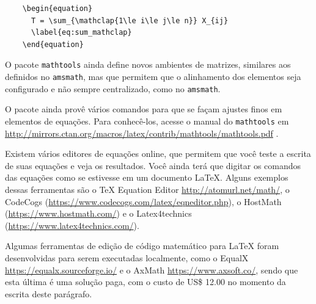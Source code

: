\begin{listing}[ht]
	\begin{verbatim}
	\begin{equation}
	  T = \sum_{\mathclap{1\le i\le j\le n}} X_{ij}
	  \label{eq:sum_mathclap}
	\end{equation}
	\end{verbatim} 
	\caption{Exemplo do uso do comando \textbackslash \texttt{mathclap}.}
	\label{cod:mathclap}
\end{listing}

O pacote \texttt{mathtools} ainda define novos ambientes de matrizes, similares aos definidos no \texttt{amsmath}, mas que permitem que o alinhamento dos elementos seja configurado e não sempre centralizado, como no \texttt{amsmath}. 

O pacote ainda provê vários comandos para que se façam ajustes finos em elementos de equações. Para conhecê-los, acesse o manual do \texttt{mathtools} em 
\url{http://mirrors.ctan.org/macros/latex/contrib/mathtools/mathtools.pdf} \parencite{mathtools}.

Existem vários editores de equações online, que permitem que você teste a escrita de suas equações e veja os resultados. Você ainda terá que digitar os comandos das equações como se estivesse em um documento \LaTeX{}. Alguns exemplos dessas ferramentas são o \TeX{} Equation Editor \url{http://atomurl.net/math/}, o CodeCogs (\url{https://www.codecogs.com/latex/eqneditor.php}), o HostMath (\url{https://www.hostmath.com/}) e o Latex4technics (\url{https://www.latex4technics.com/}).

Algumas ferramentas de edição de código matemático para \LaTeX{} foram desenvolvidas para serem executadas localmente, como o EqualX \url{https://equalx.sourceforge.io/} e o AxMath \url{https://www.axsoft.co/}, sendo que esta última é uma solução paga, com o custo de US\$ 12.00 no momento da escrita deste parágrafo.

